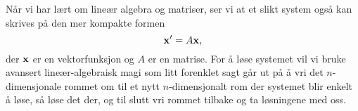 Når vi har lært om lineær algebra og matriser, ser vi at et slikt
system også kan skrives på den mer kompakte formen
\[
\mathbf{x}' = A \mathbf{x},
\]
der $\mathbf{x}$ er en vektorfunksjon og $A$ er en matrise.  For å løse
systemet vil vi bruke avansert lineær-algebraisk magi som litt
forenklet sagt går ut på å vri det $n$-dimensjonale rommet om til et
nytt $n$-dimensjonalt rom der systemet blir enkelt å løse, så løse det
der, og til slutt vri rommet tilbake og ta løsningene med oss.
